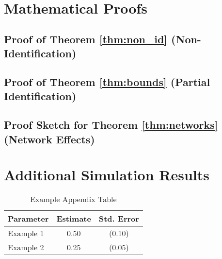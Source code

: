 \section{Mathematical Proofs}

\subsection{Proof of Theorem \ref{thm:non_id} (Non-Identification)}

\subsection{Proof of Theorem \ref{thm:bounds} (Partial Identification)}

\subsection{Proof Sketch for Theorem \ref{thm:networks} (Network Effects)}

\section{Additional Simulation Results}
\begin{table}[h!]
    \centering
    \caption{Example Appendix Table}
    \label{tab:my_label}
    \begin{tabular}{@{}lcc@{}}
    \toprule
    Parameter & Estimate & Std. Error \\ \midrule
    Example 1 & 0.50     & (0.10)     \\
    Example 2 & 0.25     & (0.05)     \\ \bottomrule
    \end{tabular}
\end{table}